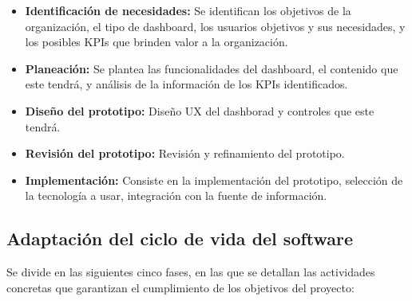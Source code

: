 \documentclass[spanish]{ieee_upb}
\begin{document}
\begin{itemize}
    \item \textbf{Identificación de necesidades: }Se identifican los objetivos de la organización, el tipo de dashboard, los usuarios objetivos y sus necesidades, y los posibles KPIs que brinden valor a la organización.
    \item \textbf{Planeación: }Se plantea las funcionalidades del dashboard, el contenido que este tendrá, y análisis de la información de los KPIs identificados.
    \item \textbf{Diseño del prototipo: }Diseño UX del dashborad y controles que este tendrá.
    \item \textbf{Revisión del prototipo: }Revisión y refinamiento del prototipo.
    \item \textbf{Implementación: }Consiste en la implementación del prototipo, selección de la tecnología a usar, integración con la fuente de información.
    
\end{itemize}



\subsection{Adaptación del ciclo de vida del software}

Se divide en las siguientes cinco fases, en las que se detallan las actividades concretas que garantizan el cumplimiento de los objetivos del proyecto:
\end{document}
